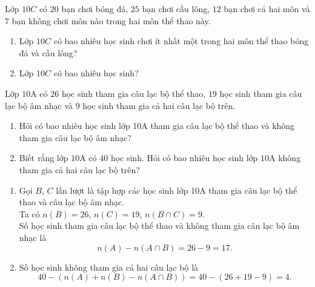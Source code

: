 \begin{bt}%
	Lớp $10C$ có $20$ bạn chơi bóng đá, $25$ bạn chơi cầu lông, $12$ bạn chơi cả hai môn và $7$ bạn không chơi môn nào trong hai môn thể thao này.
	\begin{enumerate}
		\item Lớp $10C$ có bao nhiêu học sinh chơi ít nhất một trong hai môn thể thao bóng đá và cầu lông?
		\item Lớp $10C$ có bao nhiêu học sinh?
	\end{enumerate}
\end{bt}

\begin{bt}%
     Lớp $10 \mathrm{A}$ có $26$ học sinh tham gia câu lạc bộ thể thao, $19$ học sinh tham gia câu lạc bộ âm nhạc và $9$ học sinh tham gia cả hai câu lạc bộ trên.
     \begin{enumerate}
         \item Hỏi có bao nhiêu học sinh lớp 10A tham gia câu lạc bộ thể thao và không tham gia câu lạc bộ âm nhạc?
         \item Biết rằng lớp $10 \mathrm{A}$ có $40$ học sinh. Hỏi có bao nhiêu học sinh lớp $10 \mathrm{A}$ không tham gia cả hai câu lạc bộ trên?
     \end{enumerate}

    \loigiai
    {
         \begin{enumerate}
            \item Gọi $B$, $C$ lần lượt là tập hợp các học sinh lớp 10A tham gia câu lạc bộ thể thao và câu lạc bộ âm nhạc.\\
            Ta có $n(B)=26$, $n(C)=19$, $n(B\cap C)=9$.\\
            Số học sinh tham gia câu lạc bộ thể thao và không tham gia câu lạc bộ âm nhạc là $$n(A)-n(A\cap B)=26-9=17.$$
            \item Số học sinh không tham gia cả hai câu lạc bộ là $$40-(n(A)+n(B)-n(A\cap B))=40-(26+19-9)=4.$$
        \end{enumerate}
    }
\end{bt}

